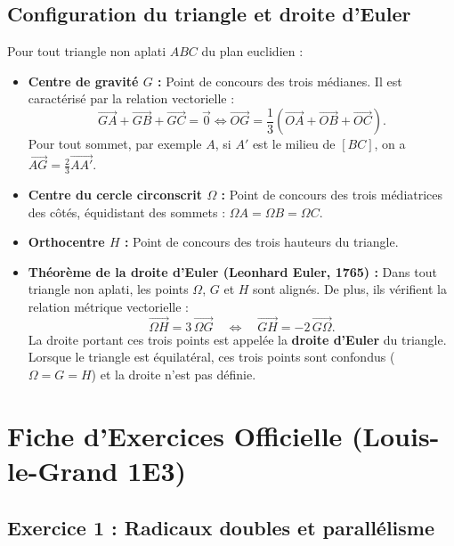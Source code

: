 \documentclass[11pt,a4paper]{article}
\newcommand{\vect}[1]{\overrightarrow{#1}}
\begin{document}
\subsection{Configuration du triangle et droite d'Euler}
Pour tout triangle non aplati $ABC$ du plan euclidien :
\begin{itemize}[leftmargin=1.5cm]
    \item \textbf{Centre de gravité $G$ :} Point de concours des trois médianes. Il est caractérisé par la relation vectorielle :
    \[
    \vect{GA} + \vect{GB} + \vect{GC} = \vec{0} \iff \vect{OG} = \frac{1}{3}\left(\vect{OA} + \vect{OB} + \vect{OC}\right).
    \]
    Pour tout sommet, par exemple $A$, si $A'$ est le milieu de $[BC]$, on a $\vect{AG} = \frac{2}{3}\vect{AA'}$.
    \item \textbf{Centre du cercle circonscrit $\Omega$ :} Point de concours des trois médiatrices des côtés, équidistant des sommets : $\Omega A = \Omega B = \Omega C$.
    \item \textbf{Orthocentre $H$ :} Point de concours des trois hauteurs du triangle.
    \item \textbf{Théorème de la droite d'Euler (Leonhard Euler, 1765) :} Dans tout triangle non aplati, les points $\Omega$, $G$ et $H$ sont alignés. De plus, ils vérifient la relation métrique vectorielle :
    \[
    \vect{\Omega H} = 3\,\vect{\Omega G} \quad \Longleftrightarrow \quad \vect{GH} = -2\,\vect{G\Omega}.
    \]
    La droite portant ces trois points est appelée la \textbf{droite d'Euler} du triangle. Lorsque le triangle est équilatéral, ces trois points sont confondus ($\Omega = G = H$) et la droite n'est pas définie.
\end{itemize}

\newpage
\section{Fiche d'Exercices Officielle (Louis-le-Grand 1E3)}

\subsection*{Exercice 1 : Radicaux doubles et parallélisme}
\end{document}
